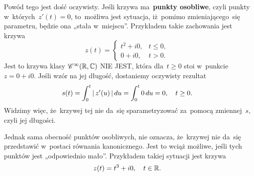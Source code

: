 \documentclass[a4paper,11pt]{article}
\begin{document}
Powód tego jest dość oczywisty. Jeśli krzywa ma~\textbf{punkty
  osobliwe}, czyli punkty w~których~$z'( t ) = 0$, to~możliwa jest
sytuacja, iż~pomimo zmieniającego~się parametru, będzie ona „stała
w~miejscu”. Przykładem takie zachowania jest krzywa
\begin{equation}
  \label{eq:Leja-Funkcje-zespolone-30}
  z( t ) =
  \begin{cases}
    t^{ 2 } + i 0, & t \leq 0, \\
    0 + i 0, & t > 0.
  \end{cases}
\end{equation}
Jest to krzywa klasy $\mathcal{C}^{ \infty }( \mathbb{R}, \mathbb{C} )$ NIE JEST, która
dla~$t \geq 0$ stoi w~punkcie $z = 0 + i 0$. Jeśli wzór na jej
długość, dostaniemy oczywisty rezultat
\begin{equation}
  \label{eq:Leja-Funkcje-zespolone-31}
  \begin{split}
    s( t ) = \int_{ 0 }^{ t } |\, {  z'( u )  } \,| \, du
    = \int_{ 0 }^{ t } 0 \, du = 0, \quad t \geq 0.
  \end{split}
\end{equation}
Widzimy więc, że~krzywej tej nie da~się sparametryzować za~pomocą
zmiennej~$s$, czyli jej długości.

Jednak sama obecność punktów osobliwych, nie oznacza, że~krzywej nie
da~się przedstawić w~postaci równania kanonicznego. Jest to wciąż
możliwe, jeśli tych punktów jest „odpowiednio mało”. Przykładem takiej
sytuacji jest krzywa
\begin{equation}
  \label{eq:Leja-Funkcje-zespolone-32}
  z( t ) = t^{ 3 } + i 0, \quad t \in \mathbb{R}.
\end{equation}
\end{document}
